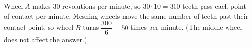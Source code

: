 Wheel $A$ makes $30$ revolutions per minute, so $30\cdot10=300$ teeth pass each point of contact per minute. Meshing wheels move the same number of teeth past their contact point, so wheel $B$ turns $\dfrac{300}{6}=\boxed{50}$ times per minute. (The middle wheel does not affect the answer.)
